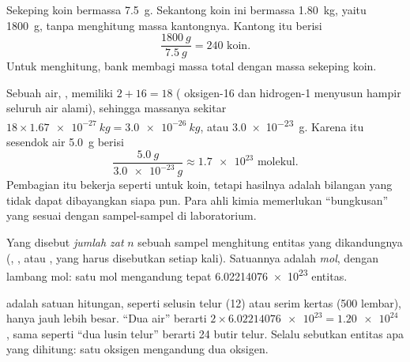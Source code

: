 \begin{example}\label{ex:g10:the-mole:coins}
Sekeping koin bermassa \qty{7.5}{g}. Sekantong koin ini bermassa
\qty{1.80}{kg}, yaitu \qty{1800}{g}, tanpa menghitung massa kantongnya.
Kantong itu berisi
\[
  \frac{\qty{1800}{g}}{\qty{7.5}{g}} = 240 \text{ koin.}
\]
Untuk menghitung, bank membagi massa total dengan massa sekeping koin.
\end{example}

\begin{example}\label{ex:g10:the-mole:spoon}
Sebuah  air, , memiliki $2 + 16 = 18$  (
oksigen-16 dan hidrogen-1 menyusun hampir seluruh air alami), sehingga
massanya sekitar $18 \times \qty{1.67e-27}{kg} = \qty{3.0e-26}{kg}$,
atau \qty{3.0e-23}{g}. Karena itu sesendok air \qty{5.0}{g} berisi
\[
  \frac{\qty{5.0}{g}}{\qty{3.0e-23}{g}} \approx \num{1.7e23}
  \text{ molekul.}
\]
Pembagian itu bekerja seperti untuk koin, tetapi hasilnya adalah
bilangan yang tidak dapat dibayangkan siapa pun. Para ahli kimia
memerlukan ``bungkusan''  yang sesuai dengan sampel-sampel di
laboratorium.
\end{example}

\begin{definition}\label{def:g10:the-mole:amount}
Yang disebut \emph{jumlah zat} $n$ sebuah sampel
menghitung entitas yang dikandungnya (, , atau , yang
harus disebutkan setiap kali). Satuannya adalah \emph{mol},
dengan lambang \si{mol}: satu mol mengandung tepat \num{6.02214076e23}
entitas.
\end{definition}

\begin{remark}\label{rem:g10:the-mole:dozen}
 adalah satuan hitungan, seperti selusin telur (12) atau serim kertas
(500 lembar), hanya jauh lebih besar. ``Dua   air'' berarti
$2 \times \num{6.02214076e23} = \num{1.20e24}$ , sama seperti
``dua lusin telur'' berarti 24 butir telur. Selalu sebutkan entitas apa
yang dihitung: satu  \emph{} oksigen  mengandung dua
 \emph{} oksigen.
\end{remark}

